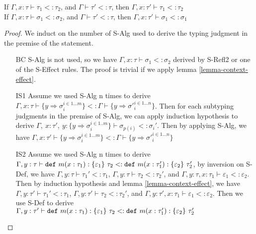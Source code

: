 \begin{lemma}
If $\Gamma, x:\tau \vdash \tau_1 <: \tau_2$, and $\Gamma \vdash \tau' <: \tau$, then $\Gamma, x:\tau' \vdash \tau_1 <: \tau_2$\\
If $\Gamma, x:\tau \vdash \sigma_1 <: \sigma_2$, and $\Gamma \vdash \tau' <: \tau$, then $\Gamma, x:\tau' \vdash \sigma_1 <: \sigma_1$

\begin{proof}
We induct on the number of S-Alg used to derive the typing judgment in the premise of the statement.
\begin{itemize}
\item[BC] S-Alg is not used, so we have $\Gamma, x:\tau \vdash \sigma_1 <: \sigma_2$ derived by S-Refl2 or one of the S-Effect rules. The proof is trivial if we apply lemma \ref{lemma-context-effect}.
\item[IS1] Assume we used S-Alg n times to derive $\Gamma, x:\tau \vdash \{ y \Rightarrow \sigma_i^{i\in1\dots m}\} <: \Gamma \vdash \{y \Rightarrow {\sigma'}_i^{i\in1\dots n}\}$. Then for each subtyping judgments in the premise of S-Alg, we can apply induction hypothesis to derive $\Gamma,~x:\tau',~y : \{ y \Rightarrow {\sigma}_i^{i \in 1..m} \} \vdash \sigma_{p(i)}<: \sigma_i'$. Then by applying S-Alg, we have $\Gamma, x:\tau' \vdash \{ y \Rightarrow \sigma_i^{i\in1\dots m}\} <: \Gamma \vdash \{y \Rightarrow {\sigma'}_i^{i\in1\dots n}\}$
\item[IS2] Assume we used S-Alg n times to derive $\Gamma, y:\tau \vdash \mathtt{def}~ m(x : \tau_1) : \{ \varepsilon_1 \}~\tau_2 <: \mathtt{def}~ m(x : \tau_1') : \{ \varepsilon_2 \}~\tau_2'$, by inversion on S-Def, we have $\Gamma, y:\tau \vdash \tau_1' <: \tau_1$, $\Gamma, y:\tau \vdash \tau_2 <: \tau_2'$, and $\Gamma, y:\tau, x:\tau_1 \vdash \varepsilon_1 <: \varepsilon_2$. Then by induction hypothesis and lemma \ref{lemma-context-effect}, we have $\Gamma, y:\tau' \vdash \tau_1' <: \tau_1$, $\Gamma, y:\tau' \vdash \tau_2 <: \tau_2'$, and $\Gamma, y:\tau', x:\tau_1 \vdash \varepsilon_1 <: \varepsilon_2$. Then we use S-Def to derive $  \Gamma, y:\tau' \vdash \mathtt{def}~ m(x : \tau_1) : \{ \varepsilon_1 \}~\tau_2 <: \mathtt{def}~ m(x : \tau_1') : \{ \varepsilon_2 \}~\tau_2'$
\end{itemize}
\end{proof}
\label{lemma-context-type}
\end{lemma}



